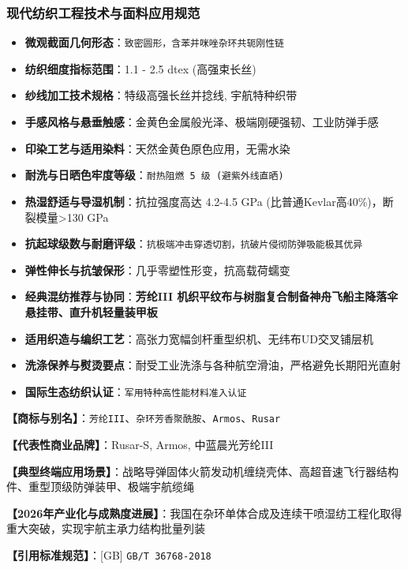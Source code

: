 \documentclass[11pt,openright,twoside,UTF8]{ctexbook}
\begin{document}
\subsubsection*{现代纺织工程技术与面料应用规范}
\begin{itemize} \setlength{\itemsep}{2pt}
    \item \textbf{微观截面几何形态}：\texttt{致密圆形，含苯并咪唑杂环共轭刚性链}
    \item \textbf{纺织细度指标范围}：1.1 - 2.5 dtex (高强束长丝)
    \item \textbf{纱线加工技术规格}：特级高强长丝并捻线, 宇航特种织带
    \item \textbf{手感风格与悬垂触感}：金黄色金属般光泽、极端刚硬强韧、工业防弹手感
    \item \textbf{印染工艺与适用染料}：天然金黄色原色应用，无需水染
    \item \textbf{耐洗与日晒色牢度等级}：\texttt{耐热阻燃 5 级 (避紫外线直晒)}
    \item \textbf{热湿舒适与导湿机制}：抗拉强度高达 4.2-4.5 GPa (比普通Kevlar高40\%)，断裂模量\textgreater{}130 GPa
    \item \textbf{抗起球级数与耐磨评级}：\texttt{抗极端冲击穿透切割，抗破片侵彻防弹吸能极其优异}
    \item \textbf{弹性伸长与抗皱保形}：几乎零塑性形变，抗高载荷蠕变
    \item \textbf{经典混纺推荐与协同}：\textbf{芳纶III 机织平纹布与树脂复合制备神舟飞船主降落伞悬挂带、直升机轻量装甲板}
    \item \textbf{适用织造与编织工艺}：高张力宽幅剑杆重型织机、无纬布UD交叉铺层机
    \item \textbf{洗涤保养与熨烫要点}：耐受工业洗涤与各种航空滑油，严格避免长期阳光直射
    \item \textbf{国际生态纺织认证}：\texttt{军用特种高性能材料准入认证}
\end{itemize}
\vspace{0.2cm}

\noindent\textbf{【商标与别名】}：\texttt{芳纶III}、\texttt{杂环芳香聚酰胺}、\texttt{Armos}、\texttt{Rusar}\par
\noindent\textbf{【代表性商业品牌】}：Rusar-S, Armos, 中蓝晨光芳纶III\par
\noindent\textbf{【典型终端应用场景】}：战略导弹固体火箭发动机缠绕壳体、高超音速飞行器结构件、重型顶级防弹装甲、极端宇航缆绳\par
\noindent\textbf{【2026年产业化与成熟度进展】}：我国在杂环单体合成及连续干喷湿纺工程化取得重大突破，实现宇航主承力结构批量列装\par
\noindent\textbf{【引用标准规范】}：[GB] \texttt{GB/T 36768-2018}\par
\vspace{0.5cm}
\end{document}
